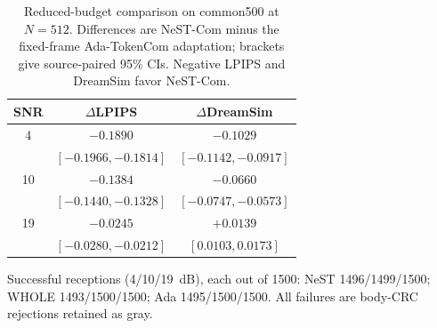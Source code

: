 \begin{table}[t]
\caption{Reduced-budget comparison on common500 at $N=512$. Differences are NeST-Com minus the fixed-frame Ada-TokenCom adaptation; brackets give source-paired 95\% CIs. Negative LPIPS and DreamSim favor NeST-Com.}
\label{tab:reduced}
\centering\footnotesize
\setlength{\tabcolsep}{4pt}
\begin{tabular}{ccc}
\toprule SNR & $\Delta$LPIPS & $\Delta$DreamSim \\
\midrule
4 & $-0.1890$ & $-0.1029$ \\
 & $[-0.1966,-0.1814]$ & $[-0.1142,-0.0917]$ \\
10 & $-0.1384$ & $-0.0660$ \\
 & $[-0.1440,-0.1328]$ & $[-0.0747,-0.0573]$ \\
19 & $-0.0245$ & $+0.0139$ \\
 & $[-0.0280,-0.0212]$ & $[0.0103,0.0173]$ \\
\bottomrule
\end{tabular}
\par\smallskip\begin{minipage}{\columnwidth}\footnotesize
Successful receptions (4/10/19~dB), each out of 1500: NeST 1496/1499/1500; WHOLE 1493/1500/1500; Ada 1495/1500/1500. All failures are body-CRC rejections retained as gray.
\end{minipage}
\end{table}
